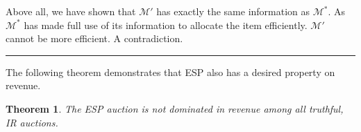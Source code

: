 \documentclass[letterpaper]{article}
\newtheorem{theorem}{Theorem}%
\newenvironment{proof}{{Proof:}}{\hfill\rule{2mm}{2mm}}
\begin{document}
\begin{proof}
	Above all, we have shown that $\mathcal{M'}$ has exactly the same information as $\mathcal{M^*}$. As $\mathcal{M^*}$ has made full use of its information to allocate the item efficiently. $\mathcal{M'}$ cannot be more efficient. A contradiction. 
	
	
	
	
	
%	
%	 
	
\end{proof}

The following theorem demonstrates that ESP also has a desired property on revenue.

\begin{theorem}
	The ESP auction is not dominated in revenue among all truthful, IR auctions.
\end{theorem}
\end{document}
